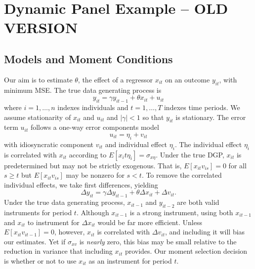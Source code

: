 
\section{Dynamic Panel Example -- OLD VERSION}

\subsection{Models and Moment Conditions}
Our aim is to estimate $\theta$, the effect of a regressor $x_{it}$ on an outcome $y_{it}$, with minimum MSE. The true data generating process is 
	\begin{equation}
				y_{it} = \gamma y_{it-1} + \theta x_{it} + u_{it}
	\end{equation}
where $i = 1, \hdots, n$ indexes individuals and $t=1, \hdots, T$  indexes time periods. We assume stationarity of $x_{it}$ and $u_{it}$ and $|\gamma|<1$ so that $y_{it}$ is stationary. The error term $u_{it}$ follows a one-way error components model
	\begin{equation}
				u_{it}= \eta_i + v_{it}
	\end{equation}
with idiosyncratic component $v_{it}$ and individual effect $\eta_i$. 
The individual effect $\eta_i$ is correlated with $x_{it}$ according to $E[x_it \eta_i]= \sigma_{x\eta}$. 
Under the true DGP, $x_{it}$ is predetermined but may not be strictly exogenous. 
That is, $E[x_{it}v_{is}] = 0$ for all $s\geq t$ but $E[x_{it}v_{is}]$ may be nonzero for $s<t$. 
To remove the correlated individual effects, we take first differences, yielding
	\begin{equation}
	\Delta y_{it} = \gamma \Delta y_{it-1} + \theta \Delta x_{it} + \Delta v_{it}.
	\end{equation}
Under the true data generating process, $x_{it-1}$ and $y_{it-2}$ are both valid instruments for period $t$.
Although $x_{it-1}$ is a strong instrument, using both $x_{it-1}$ and $x_{it}$ to instrument for $\Delta x_{it}$ would be far more efficient. 
Unless $E[x_{it}v_{it-1}]=0$, however, $x_{it}$ is correlated with $\Delta v_{it}$, and including it will bias our estimates. 
Yet if $\sigma_{xv}$ is \emph{nearly} zero, this bias may be small relative to the reduction in variance that including $x_{it}$ provides.  
Our moment selection decision is whether or not to use $x_{it}$ as an instrument for period $t$.

